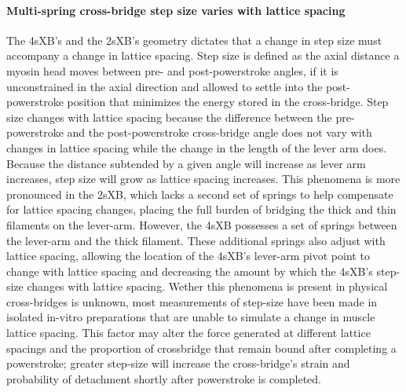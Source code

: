 \documentclass[]{article}
\begin{document}
\paragraph{Multi-spring cross-bridge step size varies with lattice spacing} %
The 4sXB's and the 2sXB's geometry dictates that a change in step size must accompany a change in lattice spacing. 
Step size is defined as the axial distance a myosin head moves between pre- and post-powerstroke angles, if it is unconstrained in the axial direction and allowed to settle into the post-powerstroke position that minimizes the energy stored in the cross-bridge.
Step size changes with lattice spacing because the difference between the pre-powerstroke and the post-powerstroke cross-bridge angle does not vary with changes in lattice spacing while the change in the length of the lever arm does. 
Because the distance subtended by a given angle will increase as lever arm increases, step size will grow as lattice spacing increases. 
This phenomena is more pronounced in the 2sXB, which lacks a second set of springs to help compensate for lattice spacing changes, placing the full burden of bridging the thick and thin filaments on the lever-arm. 
However, the 4sXB possesses a set of springs between the lever-arm and the thick filament.
These additional springs also adjust with lattice spacing, allowing the location of the 4sXB's lever-arm pivot point to change with lattice spacing and decreasing the amount by which the 4sXB's step-size changes with lattice spacing.  
Wether this phenomena is present in physical cross-bridges is unknown, most measurements of step-size have been made in isolated in-vitro preparations that are unable to simulate a change in muscle lattice spacing. %
This factor may alter the force generated at different lattice spacings and the proportion of crossbridge that remain bound after completing a powerstroke; greater step-size will increase the cross-bridge's strain and probability of detachment shortly after powerstroke is completed. 

\end{document}
